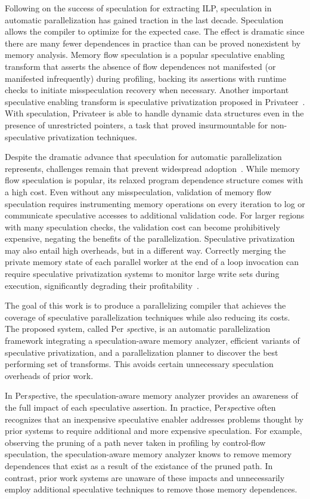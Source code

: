 Following on the success of speculation for extracting ILP,
speculation in automatic parallelization has gained traction in the
last decade.  Speculation allows the compiler to optimize for the
expected case.  The effect is dramatic since there are many
fewer dependences in practice than can be proved nonexistent by memory
analysis.  Memory flow speculation is a popular speculative enabling
transform that asserts the absence of flow dependences not manifested
(or manifested infrequently) during profiling, backing its assertions
with runtime checks to initiate misspeculation recovery when
necessary.  Another important speculative enabling transform is
speculative privatization proposed in
Privateer~\cite{johnson:12:pldi}.  With speculation,
Privateer is able to handle dynamic data structures even in the
presence of unrestricted pointers, a task that proved insurmountable
for non-speculative privatization techniques.

Despite the dramatic advance that speculation for automatic
parallelization represents, challenges remain that prevent widespread
adoption~\cite{cascaval:08:stmtoy:short,prabhu:03:ppopp,kelsey:09:cgo}.
While memory flow speculation is popular, its relaxed program
dependence structure comes with a high cost.  Even without any
misspeculation, validation of memory flow speculation requires
instrumenting memory operations on every iteration to log or
communicate speculative accesses to additional validation code.  For
larger regions with many speculation checks, the validation cost can
become prohibitively expensive, negating the benefits of the
parallelization.  Speculative privatization may also entail high
overheads, but in a different way.  Correctly merging the private memory
state of each parallel worker at the end of a loop invocation can
require speculative privatization systems to monitor large write sets
during execution, significantly degrading their
profitability~\cite{kim:12:cgo,johnson:12:pldi,rauchwerger:99:pds}.

The goal of this work is to produce a parallelizing compiler that
achieves the coverage of speculative parallelization techniques while
also reducing its costs.  The proposed system, called Per{\em
  spec}tive, is an automatic parallelization framework integrating a
speculation-aware memory analyzer, efficient variants of speculative
privatization, and a parallelization planner to discover the best
performing set of transforms.  This avoids certain unnecessary
speculation overheads of prior work.

In Per{\em spec}tive, the speculation-aware memory analyzer provides
an awareness of the full impact of each speculative assertion.  In
practice, Per{\em spec}tive often recognizes that an inexpensive
speculative enabler addresses problems thought by prior systems to
require additional and more expensive speculation.  For example,
observing the pruning of a path never taken in profiling by
control-flow speculation, the speculation-aware memory analyzer knows
to remove memory dependences that exist as a result of the existance
of the pruned path.  In contrast, prior work systems are unaware of
these impacts and unnecessarily employ additional speculative
techniques to remove those memory dependences.

